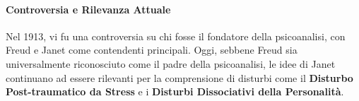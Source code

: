 \documentclass{subfiles}
\begin{document}
\paragraph*{Controversia e Rilevanza Attuale}
Nel 1913, vi fu una controversia su chi fosse il fondatore della psicoanalisi, con Freud e Janet 
come contendenti principali. Oggi, sebbene Freud sia universalmente riconosciuto come il padre 
della psicoanalisi, le idee di Janet continuano ad essere rilevanti per la comprensione di 
disturbi come il \textbf{Disturbo Post-traumatico da Stress} e i 
\textbf{Disturbi Dissociativi della Personalità}.\\
\end{document}

